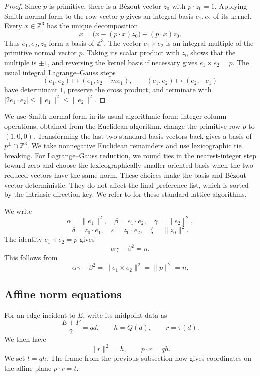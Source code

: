 \documentclass[11pt]{amsart}
\theoremstyle{definition}
\theoremstyle{remark}
\newcommand{\Z}{\mathbb Z}
\begin{document}
\begin{proof}
Since $p$ is primitive, there is a B\'ezout vector $z_0$ with
$p\cdot z_0=1$.  Applying Smith normal form to the row vector $p$ gives an
integral basis $e_1,e_2$ of its kernel.  Every $x\in\Z^3$ has the unique
decomposition
\[
 x=\bigl(x-(p\cdot x)z_0\bigr)+(p\cdot x)z_0.
\]
Thus $e_1,e_2,z_0$ form a basis of $\Z^3$.  The vector $e_1\times e_2$ is an
integral multiple of the primitive normal vector $p$.  Taking its scalar
product with $z_0$ shows that the multiple is $\pm1$, and reversing the kernel
basis if necessary gives $e_1\times e_2=p$.  The usual integral
Lagrange--Gauss steps
\[
 (e_1,e_2)\mapsto(e_1,e_2-me_1),
 \qquad
 (e_1,e_2)\mapsto(e_2,-e_1)
\]
have determinant $1$, preserve the cross product, and terminate with
$|2e_1\cdot e_2|\le\|e_1\|^2\le\|e_2\|^2$.
\end{proof}

We use Smith normal form in its usual algorithmic form: integer column
operations, obtained from the Euclidean algorithm, change the primitive row
$p$ to $(1,0,0)$.  Transforming the last two standard basis vectors back gives
a basis of $p^\perp\cap\Z^3$.  We take nonnegative Euclidean remainders and use
lexicographic tie breaking.  For Lagrange--Gauss reduction, we round ties in
the nearest-integer step toward zero and choose the lexicographically smaller
oriented basis when the two reduced vectors have the same norm.  These choices
make the basis and B\'ezout vector deterministic.  They do not affect the final
preference list, which is sorted by the intrinsic direction key.  We refer to
\cite[Chap.~2]{Cohen} for these standard lattice algorithms.

We write
\[
 \alpha=\|e_1\|^2,
 \quad
 \beta=e_1\cdot e_2,
 \quad
 \gamma=\|e_2\|^2,
\]
\[
 \delta=z_0\cdot e_1,
 \quad
 \varepsilon=z_0\cdot e_2,
 \quad
 \zeta=\|z_0\|^2.
\]
The identity $e_1\times e_2=p$ gives
\begin{equation}\label{eq:gram-det}
 \alpha\gamma-\beta^2=n.
\end{equation}
This follows from
\[
 \alpha\gamma-\beta^2
 =\|e_1\times e_2\|^2
 =\|p\|^2=n.
\]

\subsection{Affine norm equations}

For an edge incident to $E$, write its midpoint data as
\[
 \frac{E+F}{2}=qd,
 \qquad
 h=Q(d),
 \qquad
 r=\tau(d).
\]
We then have
\begin{equation}\label{eq:Pr}
 \|r\|^2=h,
 \qquad
 p\cdot r=qh.
\end{equation}
We set $t=qh$.  The frame from the previous subsection now gives coordinates
on the affine plane $p\cdot r=t$.
\end{document}
